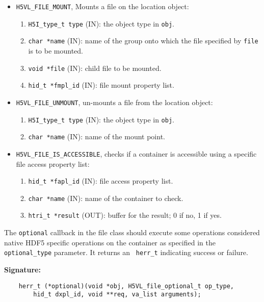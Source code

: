 \begin{itemize}
\item {\tt H5VL\_FILE\_MOUNT}, Mounts a file on the location object:
  \begin{enumerate}
  \item {\tt H5I\_type\_t type} (IN): the object type in {\tt obj}.
  \item {\tt char *name} (IN): name of the group onto which the file
    specified by {\tt file} is to be mounted.
  \item {\tt void *file} (IN): child file to be mounted.
  \item {\tt hid\_t *fmpl\_id} (IN): file mount property list.
  \end{enumerate}

\item {\tt H5VL\_FILE\_UNMOUNT}, un-mounts a file from the location object:
  \begin{enumerate}
  \item {\tt H5I\_type\_t type} (IN): the object type in {\tt obj}.
  \item {\tt char *name} (IN): name of the mount point.
  \end{enumerate}

\item {\tt H5VL\_FILE\_IS\_ACCESSIBLE}, checks if a container is
  accessible using a specific file access property list:
  \begin{enumerate}
  \item {\tt hid\_t *fapl\_id} (IN): file access property list.
  \item {\tt char *name} (IN): name of the container to check.
  \item {\tt htri\_t *result} (OUT): buffer for the result; 0 if no, 1
    if yes.
  \end{enumerate}
\end{itemize}

The {\tt optional} callback in the file class should execute some
operations considered native HDF5 specific operations on the container
as specified in the {\tt optional\_type} parameter. It returns an {\tt
  herr\_t} indicating success or failure.

\textbf{Signature:}
\begin{lstlisting}
    herr_t (*optional)(void *obj, H5VL_file_optional_t op_type, 
        hid_t dxpl_id, void **req, va_list arguments);
\end{lstlisting}

